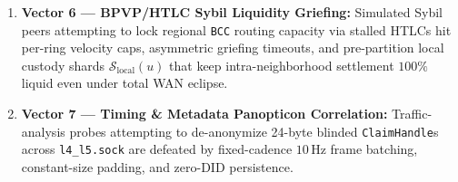 \begin{enumerate}
    cannot deadlock \texttt{col-storaged} because \texttt{col-execd} sorts and acquires every \texttt{L3ResourceLeaseLock} strictly along the global
    total order $\prec_{\mathrm{res}}$ (\texttt{0:EXERGY} $\prec$ \texttt{1:STATION} $\prec$ \texttt{2:HAUL\_TOOL} $\prec$ \texttt{3:MATERIAL\_LOT})
    \parencite{coffman1971deadlocks}.
    \item \textbf{Vector 6 --- BPVP/HTLC Sybil Liquidity Griefing:} Simulated Sybil peers attempting to lock regional \texttt{BCC} routing capacity via
    stalled HTLCs hit per-ring velocity caps, asymmetric griefing timeouts, and pre-partition local custody shards $\mathcal{S}_{\mathrm{local}}(u)$
    that keep intra-neighborhood settlement $100\%$ liquid even under total WAN eclipse.
    \item \textbf{Vector 7 --- Timing \& Metadata Panopticon Correlation:} Traffic-analysis probes attempting to de-anonymize 24-byte blinded
    \texttt{ClaimHandle}s across \texttt{l4\_l5.sock} are defeated by fixed-cadence $10\,\mathrm{Hz}$ frame batching, constant-size padding, and
    zero-DID persistence.
\end{enumerate}

